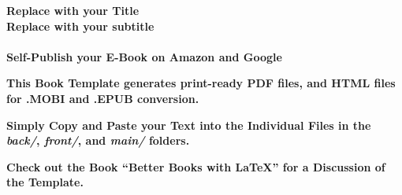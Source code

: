 \thispagestyle{empty}


	\begin{center}
		\bfseries \sffamily \LARGE Replace with your Title\\
		Replace with your subtitle
	~\\
~\\
  \bfseries \sffamily \Huge Self-Publish your E-Book on Amazon and Google\par
	\bfseries \LARGE This Book Template generates print-ready PDF files, and HTML files for .MOBI and .EPUB conversion.\par
    \bfseries \LARGE Simply Copy and Paste your Text into the Individual Files in the \textit{back/}, \textit{front/}, and \textit{main/} folders.\par
    \bfseries \LARGE Check out the Book ``Better Books with LaTeX'' for a Discussion of the Template.\par
	\end{center}

\newpage
